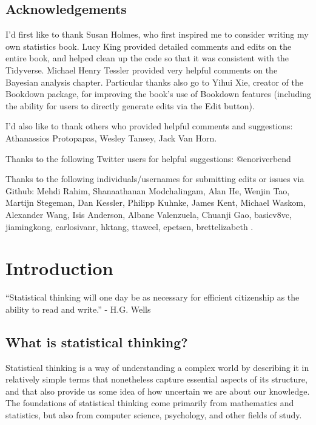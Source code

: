 \documentclass[]{book}
\theoremstyle{definition}
\theoremstyle{definition}
\theoremstyle{definition}
\theoremstyle{remark}
\begin{document}
\section{Acknowledgements}\label{acknowledgements}

I'd first like to thank Susan Holmes, who first inspired me to consider
writing my own statistics book. Lucy King provided detailed comments and
edits on the entire book, and helped clean up the code so that it was
consistent with the Tidyverse. Michael Henry Tessler provided very
helpful comments on the Bayesian analysis chapter. Particular thanks
also go to Yihui Xie, creator of the Bookdown package, for improving the
book's use of Bookdown features (including the ability for users to
directly generate edits via the Edit button).

I'd also like to thank others who provided helpful comments and
suggestions: Athanassios Protopapas, Wesley Tansey, Jack Van Horn.

Thanks to the following Twitter users for helpful suggestions:
@enoriverbend

Thanks to the following individuals/usernames for submitting edits or
issues via Github: Mehdi Rahim, Shanaathanan Modchalingam, Alan He,
Wenjin Tao, Martijn Stegeman, Dan Kessler, Philipp Kuhnke, James Kent,
Michael Waskom, Alexander Wang, Isis Anderson, Albane Valenzuela,
Chuanji Gao, basicv8vc, jiamingkong, carlosivanr, hktang, ttaweel,
epetsen, brettelizabeth .

\chapter{Introduction}\label{introduction}

``Statistical thinking will one day be as necessary for efficient
citizenship as the ability to read and write.'' - H.G. Wells

\section{What is statistical
thinking?}\label{what-is-statistical-thinking}

Statistical thinking is a way of understanding a complex world by
describing it in relatively simple terms that nonetheless capture
essential aspects of its structure, and that also provide us some idea
of how uncertain we are about our knowledge. The foundations of
statistical thinking come primarily from mathematics and statistics, but
also from computer science, psychology, and other fields of study.
\end{document}
